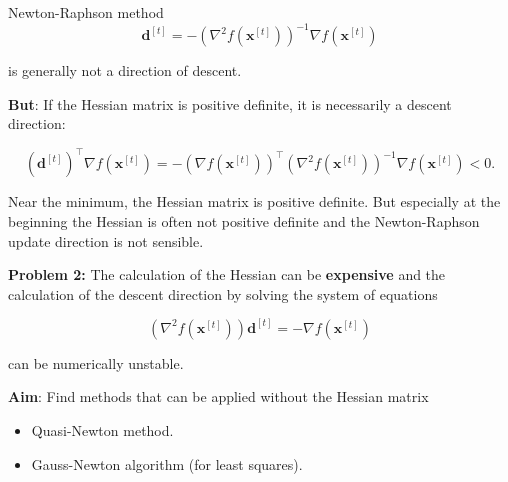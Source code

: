 \documentclass[11pt,compress,t,notes=noshow, xcolor=table]{beamer}
\begin{document}
\begin{vbframe}{Newton-Raphson method}
$$
\mathbf{d}^{[t]} = -\left(\nabla^2 f(\mathbf{x}^{[t]})\right)^{-1} \nabla f(\mathbf{x}^{[t]})
$$

is generally not a direction of descent.

\lz

\textbf{But}: If the Hessian matrix is positive definite, it is necessarily a descent direction:

$$
(\mathbf{d}^{[t]})^\top \nabla f(\mathbf{x}^{[t]}) = - \left(\nabla f(\mathbf{x}^{[t]})\right)^\top \left(\nabla^2 f(\mathbf{x}^{[t]})\right)^{-1} \nabla f(\mathbf{x}^{[t]}) <0.
$$

Near the minimum, the Hessian matrix is positive definite. But especially at the beginning the Hessian is often not positive definite and the Newton-Raphson update direction is not sensible.

\framebreak

\textbf{Problem 2:} The calculation of the Hessian can be \textbf{expensive} and the calculation of the descent direction by solving the system of equations

$$
\left(\nabla^2 f(\mathbf{x}^{[t]})\right)\mathbf{d}^{[t]} = - \nabla f(\mathbf{x}^{[t]})
$$

can be numerically unstable.

\lz

\textbf{Aim}: Find methods that can be applied without the Hessian matrix
\begin{itemize}
\item Quasi-Newton method.
\item Gauss-Newton algorithm (for least squares).
\end{itemize}



\end{vbframe}
\end{document}
